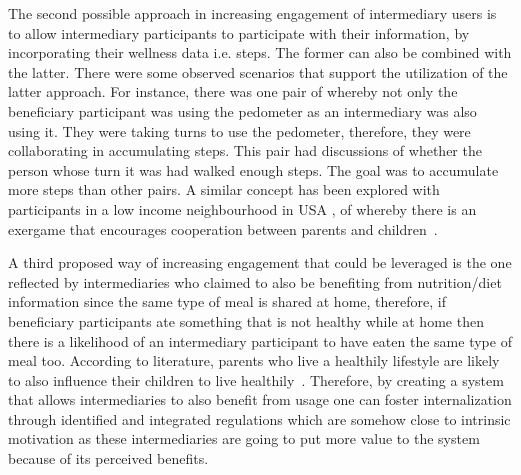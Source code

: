 The second possible approach in increasing engagement of intermediary users is to allow intermediary participants to participate with their information, by incorporating their wellness data i.e. steps. The former can also be combined with the latter. There were some observed scenarios that support the utilization of the latter approach. For instance, there was one pair of whereby not only the beneficiary participant was using the pedometer as an intermediary was also using it. They were taking turns to use the pedometer, therefore, they were collaborating in accumulating steps. This pair had discussions of whether the person whose turn it was had walked enough steps. The goal was to accumulate more steps than other pairs. A similar concept has been explored with participants in a low income neighbourhood in USA , of whereby there is an exergame that encourages cooperation between parents and children~\citep{saksono2015spaceship}.

A third proposed way of increasing engagement that could be leveraged is the one reflected by intermediaries who claimed to also be benefiting from nutrition/diet information since the same type of meal is shared at home, therefore, if beneficiary participants ate something that is not healthy while at home then there is a likelihood of an intermediary participant to have eaten the same type of meal too. According to literature, parents who live a healthily lifestyle are likely to also influence their children to live healthily~\citep{grimes2009toward}. Therefore, by creating a system that allows intermediaries to also benefit from usage one can foster internalization through identified and integrated regulations which are somehow close to intrinsic motivation  as these intermediaries are going to put more value to the system because of its perceived benefits. 

